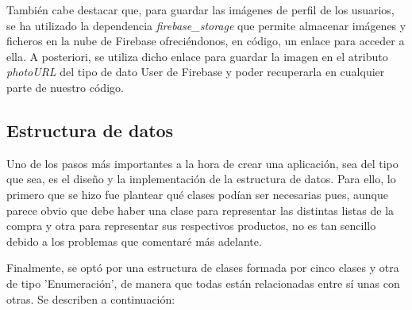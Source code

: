 \documentclass{article}
\begin{document}
También cabe destacar que, para guardar las imágenes de perfil de los usuarios, se ha utilizado la dependencia \textit{firebase\_storage} \cite{Firebase Storage} que permite almacenar imágenes y ficheros en la nube de Firebase ofreciéndonos, en código, un enlace para acceder a ella. A posteriori, se utiliza dicho enlace para guardar la imagen en el atributo \textit{photoURL} del tipo de dato User de Firebase y poder recuperarla en cualquier parte de nuestro código.

\subsection{Estructura de datos}

Uno de los pasos más importantes a la hora de crear una aplicación, sea del tipo que sea, es el diseño y la implementación de la estructura de datos. Para ello, lo primero que se hizo fue plantear qué clases podían ser necesarias pues, aunque parece obvio que debe haber una clase para representar las distintas listas de la compra y otra para representar sus respectivos productos, no es tan sencillo debido a los problemas que comentaré más adelante.

Finalmente, se optó por una estructura de clases formada por cinco clases y otra de tipo 'Enumeración', de manera que todas están relacionadas entre sí unas con otras. Se describen a continuación:
\end{document}
